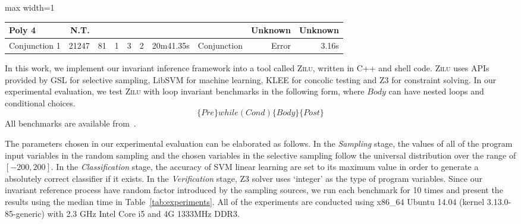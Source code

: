 \begin{table*}[t]
\begin{center}
\begin{center}
\begin{adjustbox}{max width=1\textwidth}
\begin{tabular}{l | r | r | r | r | r | r | r | r | r}
            \\
        \hline
        Poly 4 
            & N.T. & & 
            & & 
            & & 
            & Unknown & Unknown 
            \\
        \hline
        Conjunction 1
            & 21247 & 81 & 1 
            & 3 & 2 
            & 20m41.35s & Conjunction
            & Error & 3.16s
            \\
        \hline
    \end{tabular}
    \end{adjustbox}
    \end{center}
    \end{center}
    \caption{Experiment Results}
    \label{tab:experiments}
\end{table*}

In this work, we implement our invariant inference framework into a tool called \textsc{Zilu}, 
written in C++ and shell code. 
\textsc{Zilu} uses APIs provided by GSL for selective sampling, LibSVM for machine learning, 
KLEE for concolic testing and Z3 for constraint solving. 
In our experimental evaluation, 
we test \textsc{Zilu} with  loop invariant benchmarks 
in the following form, where $\mathit{Body}$ can have nested loops and conditional choices. 
\[
    \{ \mathit{Pre} \} \mathit{while}(\mathit{Cond}) \{ \mathit{Body} \} \{ \mathit{Post} \}
\]
All benchmarks are available from~\cite{zilu}. 

The parameters chosen in our experimental evaluation can be elaborated as follows. 
In the \emph{Sampling} stage, 
the values of all of the program input variables in the random sampling 
and the chosen variables in the selective sampling 
follow the universal distribution over the range of $[-200, 200]$. 
In the \emph{Classification} stage, 
the accuracy of SVM linear learning are set to its maximum value 
in order to generate a absolutely correct classifier if it exists. 
In the \emph{Verification} stage, 
Z3 solver uses `integer' as the type of program variables. 
Since our invariant reference process have random factor 
introduced by the sampling sources, 
we run each benchmark for 10 times 
and present the results using the median time in Table~\ref{tab:experiments}. 
All of the experiments are conducted using x86\_64 Ubuntu 14.04 (kernel 3.13.0-85-generic) 
with 2.3 GHz Intel Core i5 and 4G 1333MHz DDR3. 



